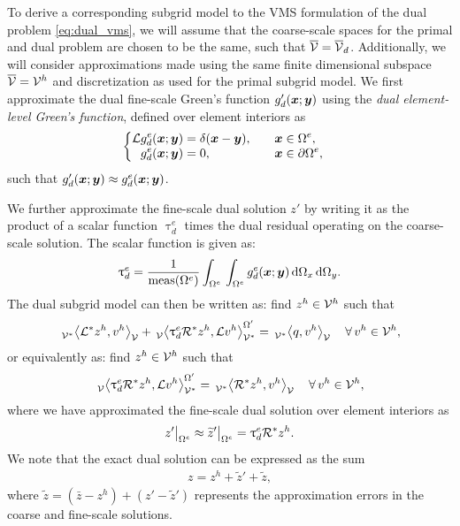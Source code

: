 To derive a corresponding subgrid model to the VMS formulation
of the dual problem \eqref{eq:dual_vms}, we will assume that the
coarse-scale spaces for the primal and dual problem are chosen
to be the same, such that $\overline{\mathcal{V}} = \overline{\mathcal{V}}_d$. Additionally, we will
consider approximations made using the same finite dimensional subspace
$\overline{\mathcal{V}} = \mathcal{V}^h$ and discretization as used for the primal
subgrid model. We first approximate the dual fine-scale Green's
function $g'_d(\boldsymbol{x};\boldsymbol{y})$ using the \emph{dual element-level
Green's function}, defined over element interiors as
%
\begin{gather}
\begin{cases}
\begin{aligned}
\mathcal{L} g^e_d(\boldsymbol{x}; \boldsymbol{y}) &= \delta(\boldsymbol{x} - \boldsymbol{y}),
\quad & & \boldsymbol{x} \in \Omega^e, \\
g^e_d(\boldsymbol{x}; \boldsymbol{y}) &= 0, \quad & & \boldsymbol{x} \in \partial \Omega^e,
\end{aligned}
\end{cases}
\label{eq:dual_elem_greens}
\end{gather}
%
such that $g'_d(\boldsymbol{x};\boldsymbol{y}) \approx g^e_d(\boldsymbol{x};\boldsymbol{y})$.

We further approximate the fine-scale dual solution $z'$
by writing it as the product of a scalar function $\uptau^e_d$
times the dual residual operating on the coarse-scale solution.
The scalar function is given as:
%
\begin{gather}
\uptau^e_d = \frac{1}{\text{meas}(\Omega^e)}
\int_{\Omega^e} \, \int_{\Omega^e}
g^e_d(\boldsymbol{x}; \boldsymbol{y}) \, \text{d} \Omega_x \, \text{d} \Omega_y.
\label{eq:dual_tau}
\end{gather}
%
The dual subgrid model can then be written as: find $z^h \in \mathcal{V}^h$
such that
%
\begin{gather}
\,{}_{\mathcal{V}^*}^{}\!\left< {\mathcal{L}^* z^h}, {v^h} \right>_{\mathcal{V}} +
\,{}_{\mathcal{V}}^{}\!\left< {\uptau^e_d \mathcal{R}^* z^h}, {\mathcal{L} v^h} \right>_{\mathcal{V}^*}^{\Omega'} =
\,{}_{\mathcal{V}^*}^{}\!\left< {q}, {v^h} \right>_{\mathcal{V}}
\quad \forall \, v^h \in \mathcal{V}^h,
\label{eq:dual_subgrid}
\end{gather}
%
or equivalently as: find $z^h \in \mathcal{V}^h$ such that
%
\begin{gather}
\,{}_{\mathcal{V}}^{}\!\left< {\uptau^e_d \mathcal{R}^* z^h}, {\mathcal{L} v^h} \right>_{\mathcal{V}^*}^{\Omega'} =
\,{}_{\mathcal{V}^*}^{}\!\left< {\mathcal{R}^* z^h}, {v^h} \right>_{\mathcal{V}}
\quad \forall \, v^h \in \mathcal{V}^h,
\label{eq:dual_subgrid_2}
\end{gather}
where we have approximated the fine-scale dual solution over
element interiors as
%
\begin{gather}
z' \bigr|_{\Omega^e} \approx
\widetilde{z}' \bigr|_{\Omega^e} =
\uptau^e_d \mathcal{R}^* z^h.
\label{eq:dual_fine_approx}
\end{gather}
%
We note that the exact dual solution can be
expressed as the sum
%
\begin{gather}
z = z^h + \tilde{z}' + \tilde{z},
\label{eq:dual_subgrid_decomp}
\end{gather}
%
where $\tilde{z} = (\bar{z} - z^h) + (z' - \tilde{z}')$
represents the approximation errors in the coarse and
fine-scale solutions.


